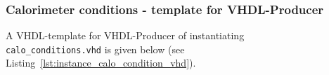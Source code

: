 % 
% 
% 
\subsubsection{Calorimeter conditions - template for VHDL-Producer}\label{sec:gtl:calo_conditions_tme}
A VHDL-template for VHDL-Producer of instantiating\\ \texttt{calo\_conditions.vhd} is given below (see Listing~\ref{lst:instance_calo_condition_vhd}).\\



